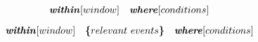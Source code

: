 \documentclass[a4paper]{article}
\begin{document}
\begin{equation}
\textbf{\textit{within}}[window ] \quad \textbf{\textit{where}}[conditions]
\end{equation}

\begin{equation}
\textbf{\textit{within}} [window ] \quad \textbf{\{} relevant\ events\textbf{\}} \quad \textbf{\textit{where}}[conditions]
\end{equation}
\end{document}
